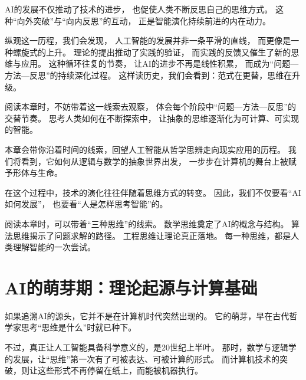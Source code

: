 AI的发展不仅推动了技术的进步，
也促使人类不断反思自己的思维方式。
这种“向外突破”与“向内反思”的互动，
正是智能演化持续前进的内在动力。

纵观这一历程，我们会发现，
人工智能的发展并非一条平滑的直线，
而更像是一种螺旋式的上升。
理论的提出推动了实践的验证，
而实践的反馈又催生了新的思维与应用。
这种循环往复的节奏，
让AI的进步不再是线性积累，
而成为“问题—方法—反思”的持续深化过程。
这样读历史，我们会看到：范式在更替，思维在升级。

阅读本章时，不妨带着这一线索去观察，
体会每个阶段中“问题—方法—反思”的交替节奏。
思考人类如何在不断探索中，
让抽象的思维逐渐化为可计算、可实现的智能。



本章会带你沿着时间的线索，回望人工智能从哲学思辨走向现实应用的历程。
我们将看到，它如何从逻辑与数学的抽象世界出发，
一步步在计算机的舞台上被赋予形体与生命。

在这个过程中，技术的演化往往伴随着思维方式的转变。
因此，我们不仅要看“AI如何发展”，
也要看“人是怎样思考智能”的。

阅读本章时，可以带着“三种思维”的线索。
数学思维奠定了AI的概念与结构。
算法思维揭示了问题求解的路径。
工程思维让理论真正落地。
每一种思维，都是人类理解智能的一次尝试。

\section{AI的萌芽期：理论起源与计算基础}



如果追溯AI的源头，它并不是在计算机时代突然出现的。
它的萌芽，早在古代哲学家思考“思维是什么”时就已种下。

不过，真正让人工智能具备科学意义的，是20世纪上半叶。
那时，数学与逻辑学的发展，让“思维”第一次有了可被表达、可被计算的形式。
而计算机技术的突破，则让这些形式不再停留在纸上，而能被机器执行。

